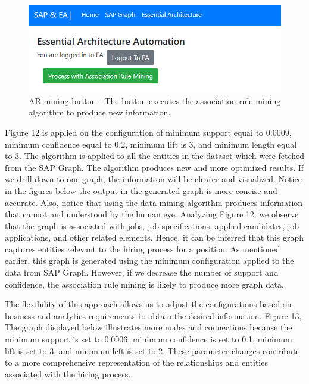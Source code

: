 \documentclass{article}
\begin{document}
\begin{figure}[ht!]
    \centering
    \includegraphics[scale=0.6]{ea-ar}
    \caption{AR-mining button - 
The button executes the association rule mining algorithm to produce new information.}
    \label{fig:ea-min-ar}
\end{figure}

Figure 12 is applied on the configuration of minimum support equal to 0.0009, minimum confidence equal to 0.2, minimum lift is 3, and minimum length equal to 3. The algorithm is applied to all the entities in the dataset which were fetched from the SAP Graph. The algorithm produces new and more optimized results. If we drill down to one graph, the information will be clearer and visualized. Notice in the figures below the output in the generated graph is more concise and accurate. Also, notice that using the data mining algorithm produces information that cannot and understood by the human eye. Analyzing Figure 12, we observe that the graph is associated with jobs, job specifications, applied candidates, job applications, and other related elements. Hence, it can be inferred that this graph captures entities relevant to the hiring process for a position. As mentioned earlier, this graph is generated using the minimum configuration applied to the data from SAP Graph. However, if we decrease the number of support and confidence, the association rule mining is likely to produce more graph data.

The flexibility of this approach allows us to adjust the configurations based on business and analytics requirements to obtain the desired information. Figure 13, The graph displayed below illustrates more nodes and connections because the minimum support is set to 0.0006, minimum confidence is set to 0.1, minimum lift is set to 3, and minimum left is set to 2. These parameter changes contribute to a more comprehensive representation of the relationships and entities associated with the hiring process.
\end{document}
